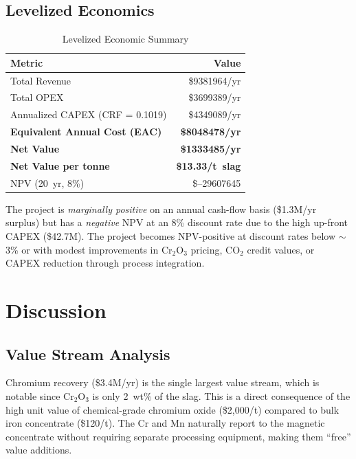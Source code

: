 \documentclass[11pt,a4paper]{article}
\begin{document}
\subsection{Levelized Economics}

\begin{table}[H]
\centering
\caption{Levelized Economic Summary}
\label{tab:economics}
\begin{tabular}{@{}lr@{}}
\toprule
\textbf{Metric} & \textbf{Value} \\
\midrule
Total Revenue & \$\num{9381964}/yr \\
Total OPEX & \$\num{3699389}/yr \\
Annualized CAPEX (CRF = 0.1019) & \$\num{4349089}/yr \\
\textbf{Equivalent Annual Cost (EAC)} & \textbf{\$\num{8048478}/yr} \\
\midrule
\textbf{Net Value} & \textcolor{sfgreen}{\textbf{\$\num{1333485}/yr}} \\
\textbf{Net Value per tonne} & \textcolor{sfgreen}{\textbf{\$13.33/t~slag}} \\
NPV (20~yr, 8\%) & \textcolor{sfred}{\$--\num{29607645}} \\
\bottomrule
\end{tabular}
\end{table}

The project is \emph{marginally positive} on an annual cash-flow basis (\$1.3M/yr surplus)
but has a \emph{negative} NPV at an 8\% discount rate due to the high up-front CAPEX
(\$42.7M). The project becomes NPV-positive at discount rates below $\sim$3\%
or with modest improvements in Cr$_2$O$_3$ pricing, CO$_2$ credit values,
or CAPEX reduction through process integration.

\section{Discussion}

\subsection{Value Stream Analysis}

Chromium recovery (\$3.4M/yr) is the single largest value stream, which is notable
since Cr$_2$O$_3$ is only 2~wt\% of the slag. This is a direct consequence of
the high unit value of chemical-grade chromium oxide (\$2{,}000/t) compared to bulk
iron concentrate (\$120/t). The Cr and Mn naturally report to the magnetic
concentrate without requiring separate processing equipment, making them
``free'' value additions.
\end{document}
